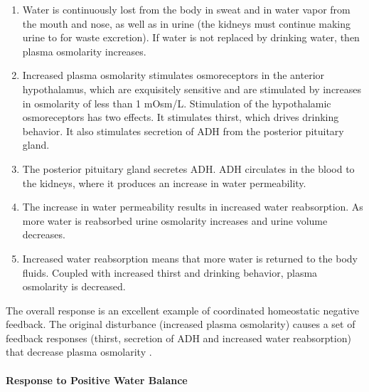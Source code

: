 \begin{enumerate}
\item Water is continuously lost from the body in sweat and in water vapor from the mouth and nose, as well as in urine (the kidneys must continue making urine to for waste excretion). If water is not replaced by drinking water, then plasma osmolarity increases. 
\item Increased plasma osmolarity stimulates osmoreceptors in the anterior hypothalamus, which are exquisitely sensitive and are stimulated by increases in osmolarity of less than 1 mOsm/L. Stimulation of the hypothalamic osmoreceptors has two effects. It stimulates thirst, which drives drinking behavior. It also stimulates secretion of ADH from the posterior pituitary gland. 
\item The posterior pituitary gland secretes ADH. ADH circulates in the blood to the kidneys, where it produces an increase in water permeability. 
\item The increase in water permeability results in increased water reabsorption. As more water is reabsorbed urine osmolarity increases and urine volume decreases. 
\item Increased water reabsorption means that more water is returned to the body fluids. Coupled with increased thirst and drinking behavior, plasma osmolarity is decreased.
\end{enumerate}

The overall response is an excellent example of coordinated homeostatic negative feedback.  The original disturbance (increased plasma osmolarity) causes a set of feedback responses (thirst, secretion of ADH and increased water reabsorption) that decrease plasma osmolarity \cite{hall_guyton_2020}.

\paragraph{Response to Positive Water Balance}

